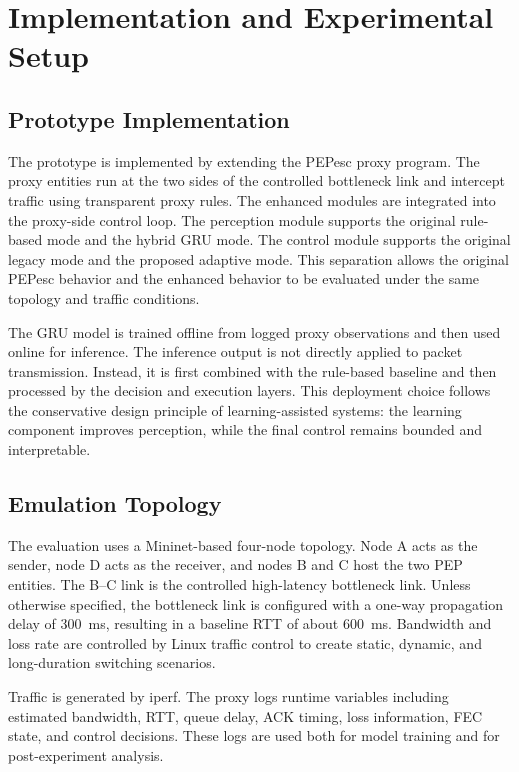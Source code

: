 \section{Implementation and Experimental Setup}
\label{sec:setup}

\subsection{Prototype Implementation}
The prototype is implemented by extending the PEPesc proxy program. The proxy entities run at the two sides of the controlled bottleneck link and intercept traffic using transparent proxy rules. The enhanced modules are integrated into the proxy-side control loop. The perception module supports the original rule-based mode and the hybrid GRU mode. The control module supports the original legacy mode and the proposed adaptive mode. This separation allows the original PEPesc behavior and the enhanced behavior to be evaluated under the same topology and traffic conditions.

The GRU model is trained offline from logged proxy observations and then used online for inference. The inference output is not directly applied to packet transmission. Instead, it is first combined with the rule-based baseline and then processed by the decision and execution layers. This deployment choice follows the conservative design principle of learning-assisted systems: the learning component improves perception, while the final control remains bounded and interpretable.

\subsection{Emulation Topology}
The evaluation uses a Mininet-based four-node topology. Node A acts as the sender, node D acts as the receiver, and nodes B and C host the two PEP entities. The B--C link is the controlled high-latency bottleneck link. Unless otherwise specified, the bottleneck link is configured with a one-way propagation delay of 300~ms, resulting in a baseline RTT of about 600~ms. Bandwidth and loss rate are controlled by Linux traffic control to create static, dynamic, and long-duration switching scenarios.

Traffic is generated by iperf. The proxy logs runtime variables including estimated bandwidth, RTT, queue delay, ACK timing, loss information, FEC state, and control decisions. These logs are used both for model training and for post-experiment analysis.

